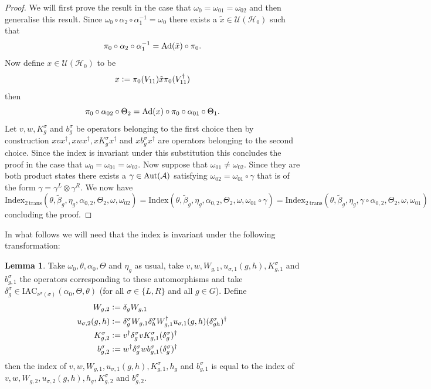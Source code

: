 \documentclass[12pt,a4paper,twoside]{article}
\newcommand{\IAC}{\textrm{IAC}}
\newcommand{\defeq}{\vcentcolon=}
\let\originalleft\left
\let\originalright\right
\renewcommand{\left}{\mathopen{}\mathclose\bgroup\originalleft}
\renewcommand{\right}{\aftergroup\egroup\originalright}
\newcommand{\UU}{\mathcal U}
\newcommand{\HH}{\mathcal H}
\renewcommand{\AA}{\mathcal A}
\newcommand{\Ad}[1]{\textrm{Ad}\left(#1\right)}
\newcommand{\Aut}[1]{\textrm{Aut}\left(#1\right)}
\theoremstyle{definition}
\newtheorem{lemma}[theorem]{Lemma}
\numberwithin{equation}{section}
\begin{document}
\begin{proof}
	We will first prove the result in the case that $\omega_0=\omega_{01}=\omega_{02}$ and then generalise this result. Since $\omega_0\circ\alpha_2\circ\alpha_1^{-1}=\omega_0$ there exists a $\tilde{x}\in\UU(\HH_0)$ such that
	\begin{equation}
		\pi_0\circ\alpha_2\circ\alpha_1^{-1}=\Ad{\tilde{x}}\circ\pi_0.
	\end{equation}
	Now define $x\in\UU(\HH_0)$ to be
	\begin{equation}
		x\defeq \pi_0(V_{11})\tilde{x} \pi_0(V_{11}^\dagger)
	\end{equation}
	then
	\begin{equation}
		\pi_0\circ\alpha_{02}\circ\Theta_2=\Ad{x}\circ\pi_0\circ\alpha_{01}\circ\Theta_1.
	\end{equation}
	Let $v,w,K_g^\sigma$ and $b_g^\sigma$ be operators belonging to the first choice then by construction $xvx^\dagger,xwx^\dagger,xK_g^\sigma x^\dagger$ and $xb_g^\sigma x^\dagger$ are operators belonging to the second choice. Since the index is invariant under this substitution this concludes the proof in the case that $\omega_0=\omega_{01}=\omega_{02}$. Now suppose that $\omega_{01}\neq\omega_{02}$. Since they are both product states there exists a $\gamma\in\Aut{\AA}$ satisfying $\omega_{02}=\omega_{01}\circ\gamma$ that is of the form $\gamma=\gamma^L\otimes\gamma^R$. We now have
	\begin{equation}
		\textrm{Index}_{2\:\text{trans}}(\theta,\tilde{\beta}_g,\eta_g,\alpha_{0,2},\Theta_2,\omega,\omega_{02})=\textrm{Index}(\theta,\tilde{\beta}_g,\eta_g,\alpha_{0,2},\Theta_2,\omega,\omega_{01}\circ\gamma)=\textrm{Index}_{2\:\text{trans}}(\theta,\tilde{\beta}_g,\eta_g,\gamma\circ\alpha_{0,2},\Theta_2,\omega,\omega_{01})
	\end{equation}
	concluding the proof.
\end{proof}
In what follows we will need that the index is invariant under the following transformation:
\begin{lemma}\label{lem:TransformationUnderDeltaTwoTranslations}
	Take $\omega_0,\theta,\alpha_0,\Theta$ and $\eta_g$ as usual, take $v,w,W_{g,1},u_{\sigma,1}(g,h),K_{g,1}^\sigma$ and $b_{g,1}^\sigma$ the operators corresponding to these automorphisms and take $\delta^\sigma_g\in\IAC_{\nu^\sigma(\sigma)}(\alpha_0,\Theta,\theta)$ (for all $\sigma\in\{L,R\}$ and all $g\in G$). Define
	\begin{align}
		W_{g,2}&\defeq\delta_g W_{g,1}\\
		u_{\sigma,2}(g,h)&\defeq \delta_g^\sigma W_{g,1}\delta_h^\sigma W_{g,1}^\dagger u_{\sigma,1}(g,h)(\delta_{gh}^\sigma)^\dagger\\
		K^\sigma_{g,2}&\defeq v^\dagger \delta_g^\sigma v K_{g,1}^\sigma (\delta_g^\sigma)^\dagger\\
		b_{g,2}^\sigma&\defeq w^\dagger\delta^\sigma_g w b_{g,1}^\sigma (\delta^\sigma_g)^\dagger
	\end{align}
	then the index of $v,w,W_{g,1},u_{\sigma,1}(g,h),K_{g,1}^\sigma,h_g$ and $b_{g,1}^\sigma$ is equal to the index of $v,w,W_{g,2},u_{\sigma,2}(g,h),h_g,K_{g,2}^\sigma$ and $b_{g,2}^\sigma$.
\end{lemma}
\end{document}
